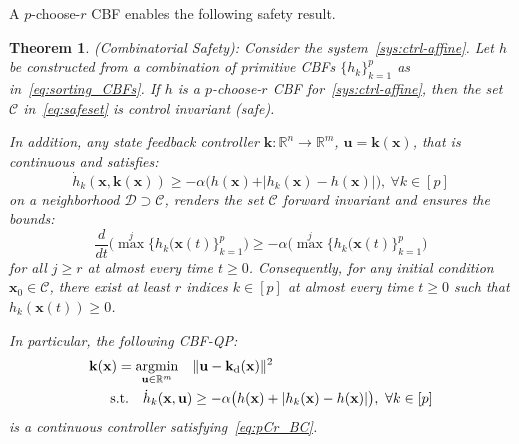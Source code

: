 \documentclass[journal,twoside,web]{ieeecolor}
\newcommand{\real}{\mathbb{R}}
\newcommand{\until}[1]{[#1]}
\newcommand{\map}[3]{#1:#2 \rightarrow #3}
\newcommand{\longthmtitle}[1]{\mbox{}{\textit{(#1):}}}
\newcommand{\Cc}{\mathcal{C}}
\newcommand{\Dc}{\mathcal{D}}
\newtheorem{theorem}{Theorem}
\theoremstyle{definition}
\newcommand{\bk}{\mathbf{k}}
\newcommand{\bu}{\mathbf{u}}
\newcommand{\bx}{\mathbf{x}}
\newcommand{\des}{{\operatorname{d}}}
\DeclareMathOperator*{\argmin}{argmin}
\begin{document}
A $p$-choose-$r$ CBF enables the following safety result.
\begin{theorem}\longthmtitle{Combinatorial Safety}
\label{thm:pCr_safety}
    Consider the system~\eqref{sys:ctrl-affine}.
    Let $h$ be constructed from a combination of primitive CBFs $\{h_k\}_{k=1}^p$ as in~\eqref{eq:sorting_CBFs}. If $h$ is a $p$-choose-$r$ CBF for~\eqref{sys:ctrl-affine}, then the set $\Cc$ in~\eqref{eq:safeset} is control invariant (safe).
    
    In addition, any state feedback controller ${\map{\bk}{\real^n}{\real^m}}$,  ${\bu=\bk(\bx)}$, that is continuous and satisfies:
    \begin{equation}
        \label{eq:pCr_BC}
    \dot h_k(\bx,\bk(\bx)) \geq -\alpha \big( h(\bx)+\vert h_k(\bx)-h(\bx)\vert \big), ~\forall k\in\until{p} 
    \end{equation}
    on a neighborhood ${\Dc\supset\Cc}$, renders the set $\Cc$ forward invariant and ensures the bounds:
    \begin{equation}\label{eq:pCr_bound}
        \frac{d}{dt} \big(\max^j\{h_k(\bx(t)\}_{k=1}^p\big) \geq -\alpha\big(\max^j\{h_k(\bx(t)\}_{k=1}^p\big)
    \end{equation}
    for all ${j \geq r}$  at almost every time $t\geq 0$. Consequently, for any initial condition~${\bx_0\in\Cc}$, there exist at least $r$ indices ${k\in \until{p}}$ at almost every time ${t\geq 0}$ such that ${h_k(\bx(t))\geq 0}$.

    In particular, the following CBF-QP:
    \begin{align}\label{eq:pCr-CBF-QP}
    \bk(\bx)  =\argmin_{\bu\in\real^m} \quad & \|\bu-\bk_\des(\bx)\|^2                                                                  \\
             \textup{s.t.} \quad  \dot h_k(\bx,\bu) &\geq -\alpha \big( h(\bx)+\vert h_k(\bx)-h(\bx)\vert \big), ~\forall k\in\until{p} \nonumber
    \end{align}
    is a continuous controller satisfying~\eqref{eq:pCr_BC}.
\end{theorem}
\end{document}

